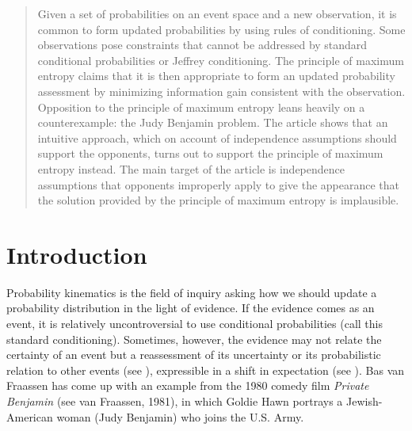 \documentclass[12pt]{article}
\begin{document}
\begin{abstract}
  \noindent Given a set of probabilities on an event space and a new
  observation, it is common to form updated probabilities by using
  rules of conditioning. Some observations pose constraints that
  cannot be addressed by standard conditional probabilities or Jeffrey
  conditioning. The principle of maximum entropy claims that it is
  then appropriate to form an updated probability assessment by
  minimizing information gain consistent with the observation.
  Opposition to the principle of maximum entropy leans heavily on a
  counterexample: the Judy Benjamin problem. The article shows that an
  intuitive approach, which on account of independence assumptions
  should support the opponents, turns out to support the principle of
  maximum entropy instead. The main target of the article is
  independence assumptions that opponents improperly apply to give the
  appearance that the solution provided by the principle of maximum
  entropy is implausible.
\end{abstract}

\section{Introduction}
\label{intro}

\nias Probability kinematics is the field of inquiry asking how we
should update a probability distribution in the light of evidence. If
the evidence comes as an event, it is relatively uncontroversial to
use conditional probabilities (call this standard conditioning).
Sometimes, however, the evidence may not relate the certainty of an
event but a reassessment of its uncertainty or its probabilistic
relation to other events (see ),
expressible in a shift in expectation (see ). Bas
van Fraassen has come up with an example from the 1980 comedy film
\emph{Private Benjamin} 
(see van Fraassen, 1981)\nonsc{}, 
in which Goldie Hawn portrays a Jewish-American woman (Judy Benjamin)
who joins the U.S. Army.
\end{document}
